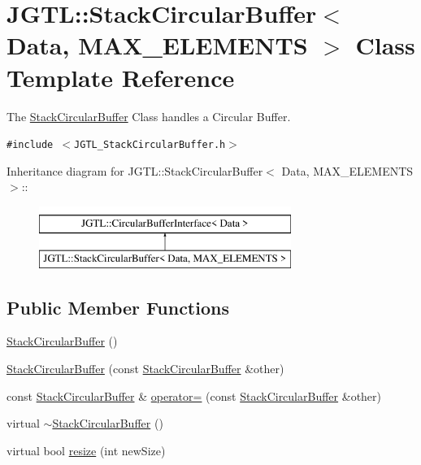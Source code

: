 \hypertarget{class_j_g_t_l_1_1_stack_circular_buffer}{
\section{JGTL::Stack\-Circular\-Buffer$<$ Data, MAX\_\-ELEMENTS $>$ Class Template Reference}
\label{class_j_g_t_l_1_1_stack_circular_buffer}
}
The \hyperlink{class_j_g_t_l_1_1_stack_circular_buffer}{Stack\-Circular\-Buffer} Class handles a Circular Buffer.  


{\tt \#include $<$JGTL\_\-Stack\-Circular\-Buffer.h$>$}

Inheritance diagram for JGTL::Stack\-Circular\-Buffer$<$ Data, MAX\_\-ELEMENTS $>$::\begin{figure}[H]
\begin{center}
\leavevmode
\includegraphics[height=2cm]{class_j_g_t_l_1_1_stack_circular_buffer}
\end{center}
\end{figure}
\subsection*{Public Member Functions}
\begin{CompactItemize}
\item 
\hyperlink{class_j_g_t_l_1_1_stack_circular_buffer_7c4eab48cf58e51095ae649a2ca1ac80}{Stack\-Circular\-Buffer} ()
\item 
\hyperlink{class_j_g_t_l_1_1_stack_circular_buffer_5446118506dc4721fcb96a6ede231c26}{Stack\-Circular\-Buffer} (const \hyperlink{class_j_g_t_l_1_1_stack_circular_buffer}{Stack\-Circular\-Buffer} \&other)
\item 
const \hyperlink{class_j_g_t_l_1_1_stack_circular_buffer}{Stack\-Circular\-Buffer} \& \hyperlink{class_j_g_t_l_1_1_stack_circular_buffer_1a099357e861a7baa232b3ee3ecbd6f4}{operator=} (const \hyperlink{class_j_g_t_l_1_1_stack_circular_buffer}{Stack\-Circular\-Buffer} \&other)
\item 
virtual \hyperlink{class_j_g_t_l_1_1_stack_circular_buffer_68a5c68dcf1b7d30bfc0c5b90db6fdcd}{$\sim$Stack\-Circular\-Buffer} ()
\item 
virtual bool \hyperlink{class_j_g_t_l_1_1_stack_circular_buffer_07b33fe01ef78d42d06a2cce77ffd2be}{resize} (int new\-Size)
\end{CompactItemize}
